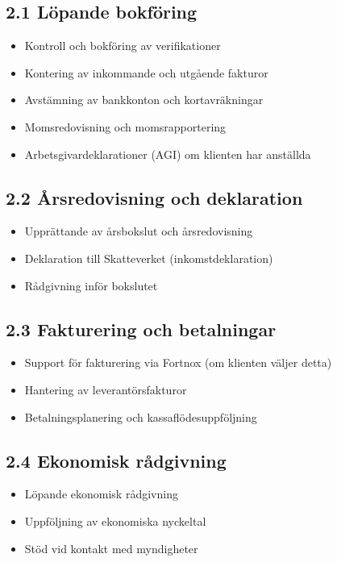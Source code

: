 \documentclass[a4paper,11pt]{article}
\begin{document}
\subsection*{2.1 Löpande bokföring}
\begin{itemize}
  \item Kontroll och bokföring av verifikationer
  \item Kontering av inkommande och utgående fakturor
  \item Avstämning av bankkonton och kortavräkningar
  \item Momsredovisning och momsrapportering
  \item Arbetsgivardeklarationer (AGI) om klienten har anställda
\end{itemize}

\subsection*{2.2 Årsredovisning och deklaration}
\begin{itemize}
  \item Upprättande av årsbokslut och årsredovisning
  \item Deklaration till Skatteverket (inkomstdeklaration)
  \item Rådgivning inför bokslutet
\end{itemize}

\subsection*{2.3 Fakturering och betalningar}
\begin{itemize}
  \item Support för fakturering via Fortnox (om klienten väljer detta)
  \item Hantering av leverantörsfakturor
  \item Betalningsplanering och kassaflödesuppföljning
\end{itemize}

\subsection*{2.4 Ekonomisk rådgivning}
\begin{itemize}
  \item Löpande ekonomisk rådgivning
  \item Uppföljning av ekonomiska nyckeltal
  \item Stöd vid kontakt med myndigheter
\end{itemize}
\end{document}
